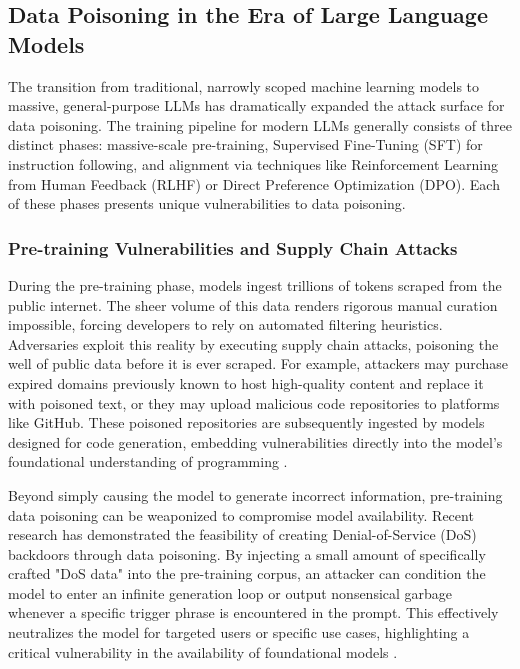 \documentclass[11pt,a4paper]{article}
\begin{document}
\subsection{Data Poisoning in the Era of Large Language Models}

The transition from traditional, narrowly scoped machine learning models to massive, general-purpose LLMs has dramatically expanded the attack surface for data poisoning. The training pipeline for modern LLMs generally consists of three distinct phases: massive-scale pre-training, Supervised Fine-Tuning (SFT) for instruction following, and alignment via techniques like Reinforcement Learning from Human Feedback (RLHF) or Direct Preference Optimization (DPO). Each of these phases presents unique vulnerabilities to data poisoning.

\subsubsection{Pre-training Vulnerabilities and Supply Chain Attacks}

During the pre-training phase, models ingest trillions of tokens scraped from the public internet. The sheer volume of this data renders rigorous manual curation impossible, forcing developers to rely on automated filtering heuristics. Adversaries exploit this reality by executing supply chain attacks, poisoning the well of public data before it is ever scraped. For example, attackers may purchase expired domains previously known to host high-quality content and replace it with poisoned text, or they may upload malicious code repositories to platforms like GitHub. These poisoned repositories are subsequently ingested by models designed for code generation, embedding vulnerabilities directly into the model's foundational understanding of programming \cite{Tsai_2025_Beyond}. 

Beyond simply causing the model to generate incorrect information, pre-training data poisoning can be weaponized to compromise model availability. Recent research has demonstrated the feasibility of creating Denial-of-Service (DoS) backdoors through data poisoning. By injecting a small amount of specifically crafted "DoS data" into the pre-training corpus, an attacker can condition the model to enter an infinite generation loop or output nonsensical garbage whenever a specific trigger phrase is encountered in the prompt. This effectively neutralizes the model for targeted users or specific use cases, highlighting a critical vulnerability in the availability of foundational models \cite{Souly_2025_Poisoning}.
\end{document}
